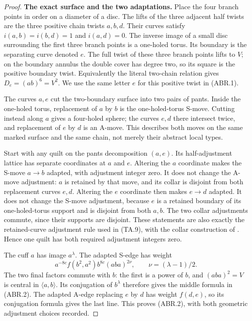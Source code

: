 \begin{proof}
\par\medskip\noindent\textbf{The exact surface and the two adaptations.}\quad
Place the four branch points in order on a diameter of a disc.
The lifts of the three adjacent half twists are the three positive
chain twists $a,b,d$.  Their curves satisfy
$i(a,b)=i(b,d)=1$ and $i(a,d)=0$.  The inverse image of a small
disc surrounding the first three branch points is a one-holed
torus.  Its boundary is the separating curve denoted $e$.
The full twist of these three branch points lifts to $V$;
on the boundary annulus the double cover has degree two, so its
square is the positive boundary twist.  Equivalently the literal
two-chain relation gives $D_e=(ab)^6=V^2$.
We use the same letter $e$ for this positive twist in (ABR.1).

The curves $a,e$ cut the two-boundary surface into two pairs of
pants.  Inside the one-holed torus, replacement of $a$ by $b$
is the one-holed-torus S-move.  Cutting instead along $a$ gives
a four-holed sphere; the curves $e,d$ there intersect twice,
and replacement of $e$ by $d$ is an A-move.  This describes
both moves on the same marked surface and the same chain,
not merely their abstract local types.

Start with any quilt on the pants decomposition $(a,e)$.
Its half-adjustment lattice has separate coordinates at $a$
and $e$.  Altering the $a$ coordinate makes the S-move
$a\to b$ adapted, with adjustment integer zero.  It does not
change the A-move adjustment: $a$ is retained by that move,
and its collar is disjoint from both replacement curves $e,d$.
Altering the $e$ coordinate then makes $e\to d$ adapted.  It
does not change the S-move adjustment, because $e$ is a retained
boundary of its one-holed-torus support and is disjoint from
both $a,b$.  The two collar adjustments commute, since their
supports are disjoint.  These statements are also exactly the
retained-curve adjustment rule used in (TA.9), with the
collar construction of \cite[\S7, Definition~7.2 and
Lemmas~7.1--7.3]{ET_NS2000}. Hence one quilt
has both required adjustment integers zero.

The cuff $a$ has image $a^\lambda$.  The adapted S-edge has
weight
\[
 a^{-8c}f(b^2,a^2)b^{8c}(aba)^{2\nu},
 \qquad \nu=(\lambda-1)/2.
\]
The two final factors commute with $b$: the first is a power of
$b$, and $(aba)^2=V$ is central in $\langle a,b\rangle$.
Its conjugation of $b^\lambda$ therefore gives the middle
formula in (ABR.2).  The adapted A-edge replacing $e$ by $d$
has weight $f(d,e)$, so its conjugation formula gives the last
line.  This proves (ABR.2), with both geometric adjustment
choices recorded.


\end{proof}
